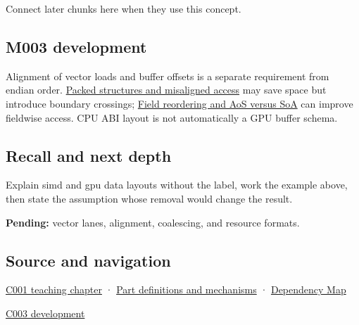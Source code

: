 Connect later chunks here when they use this concept.

\subsection{M003 development}\label{appendix-3c7b1a56de01-m003-development}

Alignment of vector loads and buffer offsets is a separate requirement from endian order. \hyperref[appendix-0682dbfc5f0e]{Packed structures and misaligned access} may save space but introduce boundary crossings; \hyperref[appendix-5522ad176ca0]{Field reordering and AoS versus SoA} can improve fieldwise access. CPU ABI layout is not automatically a GPU buffer schema.

\subsection{Recall and next depth}\label{appendix-3c7b1a56de01-recall-and-next-depth}

Explain simd and gpu data layouts without the label, work the example above, then state the assumption whose removal would change the result.

\textbf{Pending:} vector lanes, alignment, coalescing, and resource formats.

\subsection{Source and navigation}\label{appendix-3c7b1a56de01-source-and-navigation}

\hyperref[01-foundations-i-ch001-from-a-signal-to-an-interpretation]{C001 teaching chapter} · \hyperref[appendix-fd090d982a15]{Part definitions and mechanisms} · \hyperref[appendix-4ad47bdd269a]{Dependency Map}

\hyperref[01-foundations-i-ch002-where-the-bytes-live]{C003 development}
